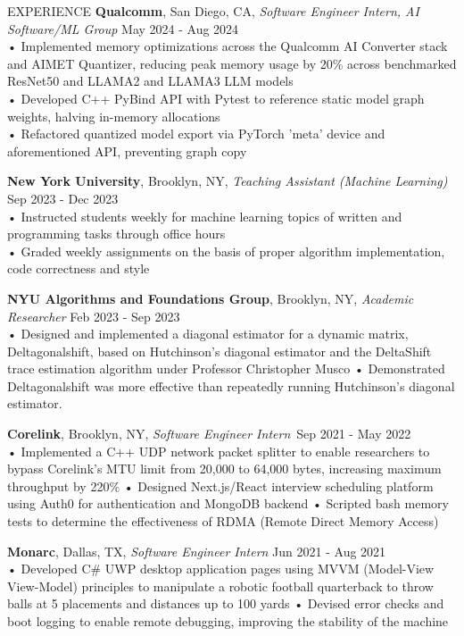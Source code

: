 \documentclass{resume} %
\begin{document}
\begin{rSection}{EXPERIENCE}
\textbf{Qualcomm}, San Diego, CA, {\emph{Software Engineer Intern, AI Software/ML Group}} \hfill May 2024 - Aug 2024 \\ 
• Implemented memory optimizations across the Qualcomm AI Converter stack and AIMET Quantizer, reducing peak memory usage by 20\% across benchmarked ResNet50 and LLAMA2 and LLAMA3 LLM models \\
• Developed C++ PyBind API with Pytest to reference static model graph weights, halving in-memory allocations \\
• Refactored quantized model export via PyTorch 'meta' device and aforementioned API, preventing graph copy

\textbf{New York University}, Brooklyn, NY, {\emph{Teaching Assistant (Machine Learning)}} \hfill Sep 2023 - Dec 2023 \\
• Instructed students weekly for machine learning topics of written and programming tasks through office hours \\
• Graded weekly assignments on the basis of proper algorithm implementation, code correctness and style 

\textbf {NYU Algorithms and Foundations Group}, Brooklyn, NY, {\emph{Academic Researcher}} \hfill Feb 2023 - Sep 2023 \\
• Designed and implemented a diagonal estimator for a dynamic matrix, Deltagonalshift, based on Hutchinson's diagonal estimator and the DeltaShift trace estimation algorithm under Professor Christopher Musco \newline
• Demonstrated Deltagonalshift was more effective than repeatedly running Hutchinson's diagonal estimator. 

\textbf{Corelink}, Brooklyn, NY, {\emph{Software Engineer Intern}}\ \hfill Sep 2021 - May 2022 \\
• Implemented a C++ UDP network packet splitter to enable researchers to bypass Corelink's MTU limit from 20,000 to 64,000 bytes, increasing maximum throughput by 220\% \newline
• Designed Next.js/React interview scheduling platform using Auth0 for authentication and MongoDB backend \newline
• Scripted bash memory tests to determine the effectiveness of RDMA (Remote Direct Memory Access) 

\textbf{Monarc}, Dallas, TX, {\emph{Software Engineer Intern}} \hfill Jun 2021 - Aug 2021 \\
• Developed C\# UWP desktop application pages using MVVM (Model-View View-Model) principles to manipulate a robotic football quarterback to throw balls at 5 placements and distances up to 100 yards \newline
• Devised error checks and boot logging to enable remote debugging, improving the stability of the machine \smallskip
\end{rSection} 
\end{document}
